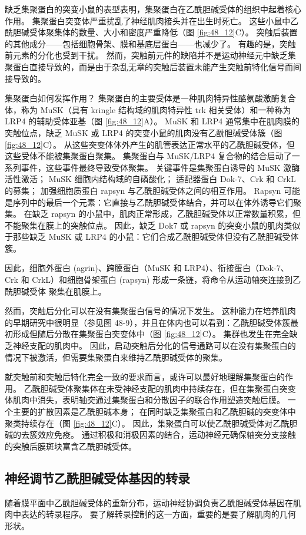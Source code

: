缺乏集聚蛋白的突变小鼠的表型表明，集聚蛋白在乙酰胆碱受体的组织中起着核心作用。 集聚蛋白突变体严重扰乱了神经肌肉接头并在出生时死亡。 这些小鼠中乙酰胆碱受体聚集体的数量、大小和密度严重降低（图 \ref{fig:48_12}C）。 突触后装置的其他成分——包括细胞骨架、膜和基底层蛋白——也减少了。 有趣的是，突触前元素的分化也受到干扰。 然而，突触前元件的缺陷并不是运动神经元中缺乏集聚蛋白直接导致的，而是由于杂乱无章的突触后装置未能产生突触前特化信号而间接导致的。

集聚蛋白如何发挥作用？ 集聚蛋白的主要受体是一种肌肉特异性酪氨酸激酶复合体，称为 MuSK（具有 kringle 结构域的肌肉特异性 trk 相关受体）和一种称为 LRP4 的辅助受体亚基（图 \ref{fig:48_12}A）。 MuSK 和 LRP4 通常集中在肌肉膜的突触位点，缺乏 MuSK 或 LRP4 的突变小鼠的肌肉没有乙酰胆碱受体簇（图 \ref{fig:48_12}C）。 从这些突变体体外产生的肌管表达正常水平的乙酰胆碱受体，但这些受体不能被集聚蛋白聚集。 集聚蛋白与 MuSK/LRP4 复合物的结合启动了一系列事件，这些事件最终导致受体聚集。 关键事件是集聚蛋白诱导的 MuSK 激酶活性激活； MuSK 细胞内结构域的自磷酸化； 适配器蛋白 Dok-7、Crk 和 CrkL 的募集； 加强细胞质蛋白 rapsyn 与乙酰胆碱受体之间的相互作用。 Rapsyn 可能是序列中的最后一个元素：它直接与乙酰胆碱受体结合，并可以在体外诱导它们聚集。 在缺乏 rapsyn 的小鼠中，肌肉正常形成，乙酰胆碱受体以正常数量积累，但不能聚集在膜上的突触位点。 因此，缺乏 Dok7 或 rapsyn 的突变小鼠的肌肉类似于那些缺乏 MuSK 或 LRP4 的小鼠：它们合成乙酰胆碱受体但没有乙酰胆碱受体簇。

因此，细胞外蛋白 (agrin)、跨膜蛋白（MuSK 和 LRP4）、衔接蛋白（Dok-7、Crk 和 CrkL）和细胞骨架蛋白 (rapsyn) 形成一条链，将命令从运动轴突连接到乙酰胆碱受体 聚集在肌膜上。

然而，突触后分化可以在没有集聚蛋白信号的情况下发生。 这种能力在培养肌肉的早期研究中很明显（参见图 48-9），并且在体内也可以看到：乙酰胆碱受体簇最初形成但随后分散在集聚蛋白突变体中（图 \ref{fig:48_12}C）。 集群也发生在完全缺乏神经支配的肌肉中。 因此，启动突触后分化的信号通路可以在没有集聚蛋白的情况下被激活，但需要集聚蛋白来维持乙酰胆碱受体的聚集。

就突触前和突触后特化完全一致的要求而言，或许可以最好地理解集聚蛋白的作用。 乙酰胆碱受体聚集体在未受神经支配的肌肉中持续存在，但在集聚蛋白突变体肌肉中消失，表明轴突通过集聚蛋白和分散因子的联合作用塑造突触后膜。 一个主要的扩散因素是乙酰胆碱本身； 在同时缺乏集聚蛋白和乙酰胆碱的突变体中聚类持续存在（图 \ref{fig:48_12}C）。 因此，集聚蛋白可以使乙酰胆碱受体对乙酰胆碱的去簇效应免疫。 通过积极和消极因素的结合，运动神经元确保轴突分支接触的突触后膜斑块富含乙酰胆碱受体。

\subsection{神经调节乙酰胆碱受体基因的转录}
随着膜平面中乙酰胆碱受体的重新分布，运动神经协调负责乙酰胆碱受体基因在肌肉中表达的转录程序。 要了解转录控制的这一方面，重要的是要了解肌肉的几何形状。

